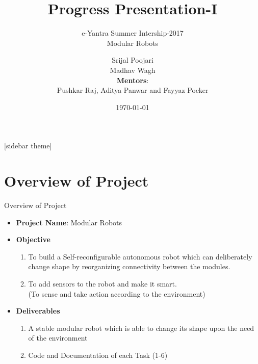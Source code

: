 \documentclass[10pt, a4paper]{beamer}
\begin{document}
	\title{Progress Presentation-I}
	\subtitle{e-Yantra Summer Intership-2017 \\ Modular Robots}
	\author{Srijal Poojari\\Madhav Wagh\\
	\textbf{Mentors}: \\
	 Pushkar Raj, Aditya Panwar and Fayyaz Pocker}
	\date{\today}
	\frame{\titlepage}

[sidebar theme]
\section{Overview of Project}
\begin{frame}{Overview of Project}
	\begin{itemize}
		\item \textbf{Project Name}:  Modular Robots
		\item \textbf{Objective} 
		\begin{enumerate}
		\item To build a Self-reconfigurable autonomous 	     		robot which can deliberately change shape by 				reorganizing connectivity between the modules.
		\linebreak
		\item To add sensors to the robot and make it smart. 		\\(To sense and take action according to the 				  environment)
		\linebreak
		\end{enumerate}
		\item \textbf{Deliverables}
		\begin{enumerate}
		 \item A stable modular robot which is able to 					  change its shape upon the need of the 					  environment\linebreak
		\item Code and Documentation of each Task (1-6)
		\end{enumerate}
	\end{itemize}
\end{frame}
\end{document}
